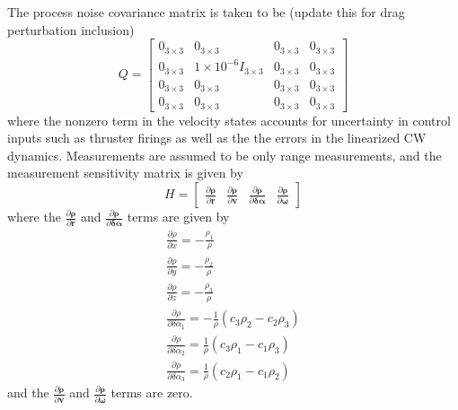 \documentclass[conf]{new-aiaa}
\begin{document}
The process noise covariance matrix is taken to be {\color{red} (update this for drag perturbation inclusion)}
\begin{equation}
    Q = \begin{bmatrix}
        0_{3\times3} & 0_{3\times3} & 0_{3\times3} & 0_{3\times3}\\ 
        0_{3\times3} & 1\times10^{-6}I_{3\times3} & 0_{3\times3} & 0_{3\times3} \\ 
        0_{3\times3} & 0_{3\times3} & 0_{3\times3} & 0_{3\times3}\\ 
        0_{3\times3} & 0_{3\times3} & 0_{3\times3} & 0_{3\times3}
        \end{bmatrix}
\end{equation}
where the nonzero term in the velocity states accounts for uncertainty in control inputs such as thruster firings as well as the the errors in the linearized CW dynamics.  Measurements are assumed to be only range measurements, and the measurement sensitivity matrix is given by
\begin{equation}H = \begin{bmatrix}\displaystyle\frac{\partial \bm \rho}{\partial \bm r} & \displaystyle\frac{\partial \bm \rho}{\partial \bm v} & \displaystyle\frac{\partial \bm \rho}{\partial \bm \delta\bm\alpha} & \displaystyle\frac{\partial \bm \rho}{\partial \bm \omega}\end{bmatrix}\end{equation}
where the $\frac{\partial\bm\rho}{\partial\bm r}$ and $\frac{\partial \bm \rho}{\partial\bm\delta\bm\alpha}$ terms are given by 
\begin{subequations}
\begin{gather}
    \frac{\partial \rho}{\partial x}=-\frac{\rho_1}{\rho} \\
    \frac{\partial \rho}{\partial y}=-\frac{\rho_2}{\rho} \\
    \frac{\partial \rho}{\partial z}=-\frac{\rho_3}{\rho} \\
    \frac{\partial \rho}{\partial \delta \alpha_1}=-\frac{1}{\rho}(c_3\rho_2-c_2\rho_3) \\
    \frac{\partial \rho}{\partial \delta \alpha _2}=\frac{1}{\rho}(c_3\rho_1-c_1\rho_3) \\
    \frac{\partial \rho}{\partial \delta \alpha_3}=\frac{1}{\rho}(c_2\rho_1-c_1\rho_2)
\end{gather}
\label{eq:partials}
\end{subequations}
and the $\frac{\partial \bm \rho}{\partial \bm v}$ and $\frac{\partial \bm \rho}{\partial \bm \omega}$ terms are zero.
\end{document}
